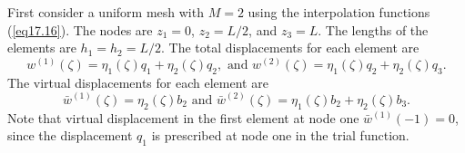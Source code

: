 \documentclass{AeroStructure-ERJohnson}
\begin{document}
\begin{example} \label{ex17.2}
First consider a uniform mesh with $M=2$ using the interpolation functions (\ref{eq17.16}). The nodes are $z_{1}=0$, $z_{2}=L/2$, and $z_{3}=L$. The lengths of the elements are $h_{1}=h_{2}=L/2$. The total displacements for each element are
\begin{equation}
w^{(1)}(\zeta)=\eta_{1}(\zeta) q_{1}+\eta_{2}(\zeta) q_{2}, \textrm{ and } w^{(2)}(\zeta)=\eta_{1}(\zeta) q_{2}+\eta_{2}(\zeta) q_{3}. \label{eq17.2.a}\tag{a}
\end{equation}
The virtual displacements for each element are
\begin{equation}
\bar{w}^{(1)}(\zeta)=\eta_{2}(\zeta) b_{2} \textrm{ and } \bar{w}^{(2)}(\zeta)=\eta_{1}(\zeta) b_{2}+\eta_{2}(\zeta) b_{3}. \label{eq17.2.b}\tag{b}
\end{equation}
Note that virtual displacement in the first element at node one $\bar{w}^{(1)}(-1)=0$, since the displacement $q_1$ is prescribed at node one in the trial function.


\end{example}
\end{document}
